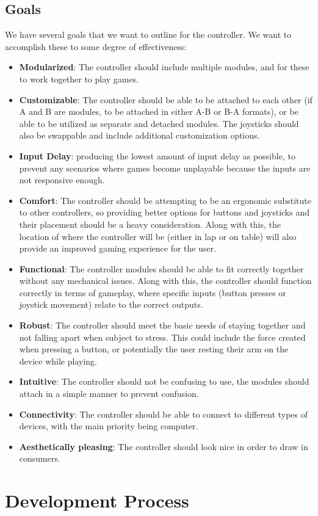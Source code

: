 \documentclass[a4]{article}
\begin{document}
\subsection{Goals}
We have several goals that we want to outline for the controller. We want to accomplish these to some degree of effectiveness:
\begin{itemize}
    \item \textbf{Modularized}: The controller should include multiple modules, and for these to work together to play games.
    \item \textbf{Customizable}: The controller should be able to be attached to each other (if A and B are modules, to be attached in either A-B or B-A formats), or be able to be utilized as separate and detached modules.
        The joysticks should also be swappable and include additional customization options.
    \item \textbf{Input Delay}: producing the lowest amount of input delay as possible, to prevent any scenarios where games become unplayable because the inputs are not responsive enough.
    \item \textbf{Comfort}: The controller should be attempting to be an ergonomic substitute to other controllers, so providing better options for buttons and joysticks and their placement should be a heavy consideration. 
        Along with this, the location of where the controller will be (either in lap or on table) will also provide an improved gaming experience for the user.
    \item \textbf{Functional}: The controller modules should be able to fit correctly together without any mechanical issues. Along with this, the controller should function correctly in terms of gameplay, where specific inputs (button presses or joystick movement) relate to the correct outputs.
    \item \textbf{Robust}: The controller should meet the basic needs of staying together and not falling apart when subject to stress. This could include the force created when pressing a button, or potentially the user resting their arm on the device while playing.
    \item \textbf{Intuitive}: The controller should not be confusing to use, the modules should attach in a simple manner to prevent confusion.
    \item \textbf{Connectivity}: The controller should be able to connect to different types of devices, with the main priority being computer.
    \item \textbf{Aesthetically pleasing}: The controller should look nice in order to draw in consumers.   
\end{itemize}

\section{Development Process}
\end{document}
